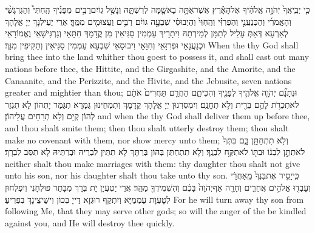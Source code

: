 \newperek
{}
{כִּ֤י יְבִֽיאֲךָ֙ יְהֹוָ֣ה אֱלֹהֶ֔יךָ אֶל\maqqaf הָאָ֕רֶץ אֲשֶׁר\maqqaf אַתָּ֥ה בָא\maqqaf שָׁ֖מָּה לְרִשְׁתָּ֑הּ וְנָשַׁ֣ל גּֽוֹיִם\maqqaf רַבִּ֣ים \pasek  מִפָּנֶ֡יךָ הַֽחִתִּי֩ וְהַגִּרְגָּשִׁ֨י וְהָאֱמֹרִ֜י וְהַכְּנַעֲנִ֣י וְהַפְּרִזִּ֗י וְהַֽחִוִּי֙ וְהַיְבוּסִ֔י שִׁבְעָ֣ה גוֹיִ֔ם רַבִּ֥ים וַעֲצוּמִ֖ים מִמֶּֽךָּ׃}
{אֲרֵי יַעֵילִנָּךְ יְיָ אֱלָהָךְ לְאַרְעָא דְּאַתְּ עָלֵיל לְתַמָּן לְמֵירְתַהּ וִיתָרֵיךְ עַמְמִין סַגִּיאִין מִן קֳדָמָךְ חִתָּאֵי וְגַרְגִּישָׁאֵי וֶאֱמוֹרָאֵי וּכְנַעֲנָאֵי וּפְרִזָּאֵי וְחִוָּאֵי וִיבוּסָאֵי שִׁבְעָא עַמְמִין סַגִּיאִין וְתַקִּיפִין מִנָּךְ׃}
{When the \lord\space thy God shall bring thee into the land whither thou goest to possess it, and shall cast out many nations before thee, the Hittite, and the Girgashite, and the Amorite, and the Canaanite, and the Perizzite, and the Hivite, and the Jebusite, seven nations greater and mightier than thou;}{}
{וּנְתָנָ֞ם יְהֹוָ֧ה אֱלֹהֶ֛יךָ לְפָנֶ֖יךָ וְהִכִּיתָ֑ם הַחֲרֵ֤ם תַּחֲרִים֙ אֹתָ֔ם לֹא\maqqaf תִכְרֹ֥ת לָהֶ֛ם בְּרִ֖ית וְלֹ֥א תְחׇנֵּֽם׃}
{וְיִמְסְרִנּוּן יְיָ אֱלָהָךְ קֳדָמָךְ וְתִמְחֵינוּן גַּמָּרָא תְגַּמַּר יָתְהוֹן לָא תִגְזַר לְהוֹן קְיָם וְלָא תְרַחֵים עֲלֵיהוֹן׃}
{and when the \lord\space thy God shall deliver them up before thee, and thou shalt smite them; then thou shalt utterly destroy them; thou shalt make no covenant with them, nor show mercy unto them;}{}
{וְלֹ֥א תִתְחַתֵּ֖ן בָּ֑ם בִּתְּךָ֙ לֹא\maqqaf תִתֵּ֣ן לִבְנ֔וֹ וּבִתּ֖וֹ לֹא\maqqaf תִקַּ֥ח לִבְנֶֽךָ׃}
{וְלָא תִתְחַתַּן בְּהוֹן בְּרַתָּךְ לָא תִתֵּין לִבְרֵיהּ וּבְרַתֵּיהּ לָא תִסַּב לִבְרָךְ׃}
{neither shalt thou make marriages with them: thy daughter thou shalt not give unto his son, nor his daughter shalt thou take unto thy son.}{}
{כִּֽי\maqqaf יָסִ֤יר אֶת\maqqaf בִּנְךָ֙ מֵֽאַחֲרַ֔י וְעָבְד֖וּ אֱלֹהִ֣ים אֲחֵרִ֑ים וְחָרָ֤ה אַף\maqqaf יְהֹוָה֙ בָּכֶ֔ם וְהִשְׁמִידְךָ֖ מַהֵֽר׃}
{אֲרֵי יַטְעֲיָן יָת בְּרָךְ מִבָּתַר פּוּלְחָנִי וְיִפְלְחוּן לְטָעֲוָת עַמְמַיָּא וְיִתְקַף רוּגְזָא דַּייָ בְּכוֹן וִישֵׁיצֵינָךְ בִּפְרִיעַ׃}
{For he will turn away thy son from following Me, that they may serve other gods; so will the anger of the \lord\space be kindled against you, and He will destroy thee quickly.}{}
